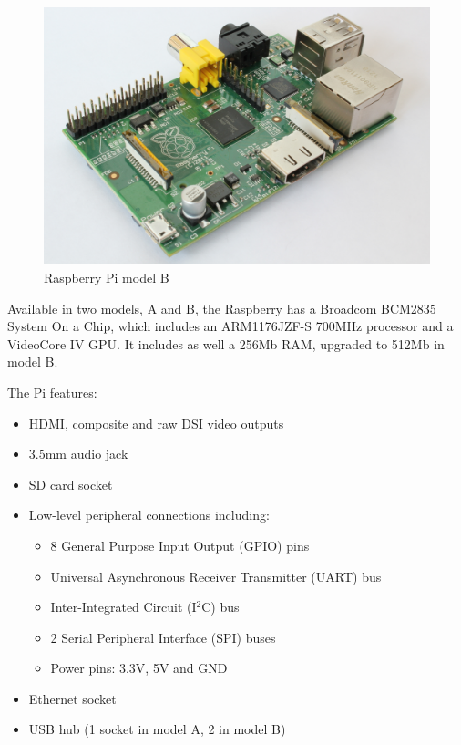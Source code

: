 		\begin{figure}[H]
				\centering
				\includegraphics[scale=0.07]{images/ProjectComponents/raspberry.jpg}
				\caption{Raspberry Pi model B}
				\label{}
		\end{figure}
		\bigskip

	Available in two models, A and B, the Raspberry has a Broadcom BCM2835 System On a Chip, which includes an ARM1176JZF-S 700MHz processor and a VideoCore IV GPU. It includes as well a 256Mb RAM, upgraded to 512Mb in model B.\\

	\bigskip

	The Pi features: 
		\begin{itemize}
			  \item HDMI, composite and raw DSI video outputs
			  \item 3.5mm audio jack
			  \item SD card socket
			  \item Low-level peripheral connections including:
			  	\begin{itemize}
			  	\item 8 General Purpose Input Output (GPIO) pins
			  	\item Universal Asynchronous Receiver Transmitter (UART) bus
			  	\item Inter-Integrated Circuit (I$^2$C) bus
			  	\item 2 Serial Peripheral Interface (SPI) buses
			  	\item Power pins: 3.3V, 5V and GND
			  	\end{itemize}
			  \item Ethernet socket
			  \item USB hub (1 socket in model A, 2 in model B)

		\end{itemize}

